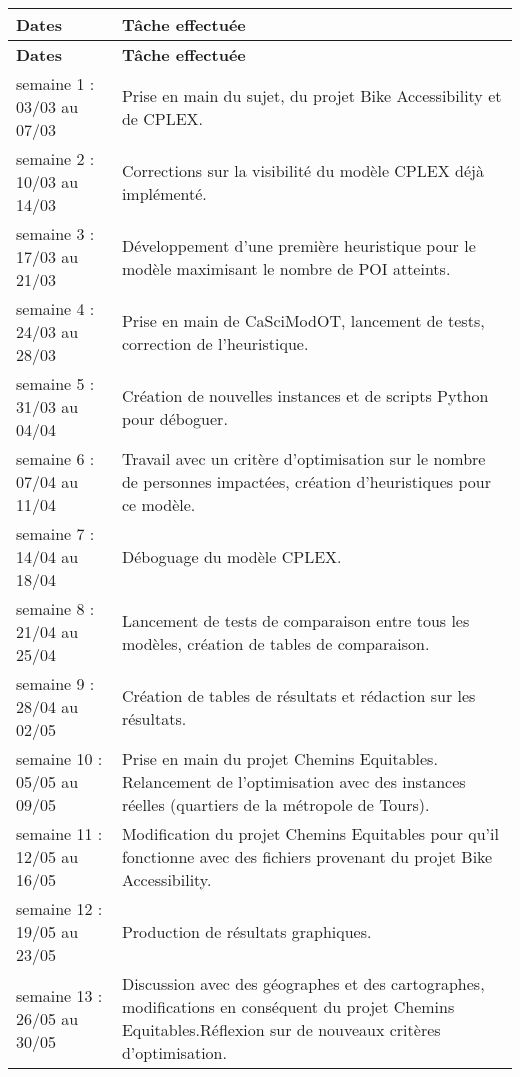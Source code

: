 \begin{longtable}[H]{| m{5cm} | m{10cm} |}
\hline
\textbf{Dates} & \textbf{Tâche effectuée}\\
\hline
\endfirsthead

\hline
\textbf{Dates} & \textbf{Tâche effectuée}\\
\hline
\endhead

\hline
\endfoot

\hline
\endlastfoot

semaine 1 : 03/03 au 07/03 & Prise en main du sujet, du projet Bike Accessibility et de CPLEX. \\
\hline
semaine 2 : 10/03 au 14/03 & Corrections sur la visibilité du modèle CPLEX déjà implémenté.\\
\hline
semaine 3 : 17/03 au 21/03 & Développement d'une première heuristique pour le modèle maximisant le nombre de POI atteints.\\
\hline
semaine 4 : 24/03 au 28/03 & Prise en main de CaSciModOT, lancement de tests, correction de l'heuristique.\\
\hline
semaine 5 : 31/03 au 04/04 & Création de nouvelles instances et de scripts Python pour déboguer.\\
\hline
semaine 6 : 07/04 au 11/04 & Travail avec un critère d'optimisation sur le nombre de personnes impactées, création d'heuristiques pour ce modèle. \\
\hline
semaine 7 : 14/04 au 18/04 & Déboguage du modèle CPLEX.\\
\hline
semaine 8 : 21/04 au 25/04 & Lancement de tests de comparaison entre tous les modèles, création de tables de comparaison.\\
\hline
semaine 9 : 28/04 au 02/05 & Création de tables de résultats et rédaction sur les résultats. \\
\hline
semaine 10 : 05/05 au 09/05 & Prise en main du projet Chemins Equitables. Relancement de l'optimisation avec des instances réelles (quartiers de la métropole de Tours). \\
\hline
semaine 11 : 12/05 au 16/05 & Modification du projet Chemins Equitables pour qu'il fonctionne avec des fichiers provenant du projet Bike Accessibility. \\
\hline
semaine 12 : 19/05 au 23/05 & Production de résultats graphiques. \\
\hline
semaine 13 : 26/05 au 30/05 & Discussion avec des géographes et des cartographes, modifications en conséquent du projet Chemins Equitables.Réflexion sur de nouveaux critères d'optimisation. \\

\end{longtable}
